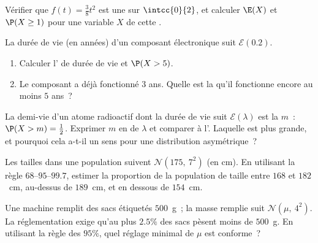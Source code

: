 \begin{exercise}[$\star$]\label{exo:g12:contdist:2}
Vérifier que $f(t) = \frac{3}{8}t^2$ est une  sur $\intcc{0}{2}$, et
calculer $\E(X)$ et $\P(X \geq 1)$ pour une variable $X$ de cette .
\end{exercise}

\begin{exercise}[$\star$]\label{exo:g12:contdist:3}
La durée de vie (en années) d'un composant électronique suit
$\mathcal E(0.2)$.
\begin{enumerate}
  \item Calculer l' de durée de vie et $\P(X > 5)$.
  \item Le composant a déjà fonctionné $3$ ans. Quelle est la
         qu'il fonctionne encore au moins $5$ ans~?
\end{enumerate}
\end{exercise}

\begin{exercise}[$\star\star$]\label{exo:g12:contdist:4}
La demi-vie d'un atome radioactif dont la durée de vie suit
$\mathcal E(\lambda)$ est la  $m$~: $\P(X > m) = \frac12$. Exprimer
$m$ en  de $\lambda$ et comparer à l'. Laquelle est plus
grande, et pourquoi cela a-t-il un sens pour une distribution asymétrique~?
\end{exercise}

\begin{exercise}[$\star\star$]\label{exo:g12:contdist:5}
Les tailles dans une population suivent $\mathcal N(175,\ 7^2)$ (en cm). En
utilisant la règle $68$--$95$--$99.7$, estimer la proportion de la
population de taille entre $168$ et $182$~cm, au-dessus de $189$~cm, et en
dessous de $154$~cm.
\end{exercise}

\begin{exercise}[$\star\star$]\label{exo:g12:contdist:6}
Une machine remplit des sacs étiquetés $500$~g~; la masse remplie suit
$\mathcal N(\mu,\ 4^2)$. La réglementation exige qu'au plus $2.5\%$ des sacs
pèsent moins de $500$~g. En utilisant la règle des $95\%$, quel réglage
minimal de $\mu$ est conforme~?
\end{exercise}

